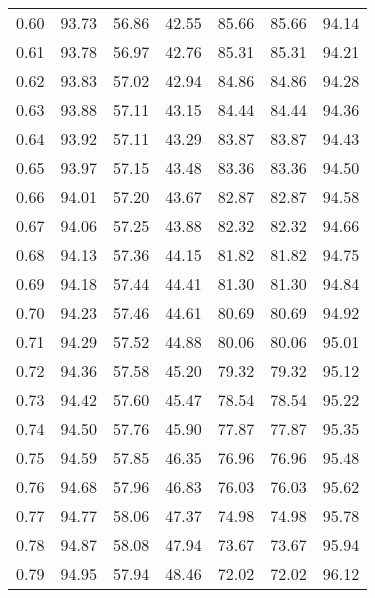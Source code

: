 \begin{tabular}{|c|c|c|c|c|c|c|}
      0.60 &     93.73 &     56.86 &      42.55 &   85.66 &      85.66 &         94.14 \\
      0.61 &     93.78 &     56.97 &      42.76 &   85.31 &      85.31 &         94.21 \\
      0.62 &     93.83 &     57.02 &      42.94 &   84.86 &      84.86 &         94.28 \\
      0.63 &     93.88 &     57.11 &      43.15 &   84.44 &      84.44 &         94.36 \\
      0.64 &     93.92 &     57.11 &      43.29 &   83.87 &      83.87 &         94.43 \\
      0.65 &     93.97 &     57.15 &      43.48 &   83.36 &      83.36 &         94.50 \\
      0.66 &     94.01 &     57.20 &      43.67 &   82.87 &      82.87 &         94.58 \\
      0.67 &     94.06 &     57.25 &      43.88 &   82.32 &      82.32 &         94.66 \\
      0.68 &     94.13 &     57.36 &      44.15 &   81.82 &      81.82 &         94.75 \\
      0.69 &     94.18 &     57.44 &      44.41 &   81.30 &      81.30 &         94.84 \\
      0.70 &     94.23 &     57.46 &      44.61 &   80.69 &      80.69 &         94.92 \\
      0.71 &     94.29 &     57.52 &      44.88 &   80.06 &      80.06 &         95.01 \\
      0.72 &     94.36 &     57.58 &      45.20 &   79.32 &      79.32 &         95.12 \\
      0.73 &     94.42 &     57.60 &      45.47 &   78.54 &      78.54 &         95.22 \\
      0.74 &     94.50 &     57.76 &      45.90 &   77.87 &      77.87 &         95.35 \\
      0.75 &     94.59 &     57.85 &      46.35 &   76.96 &      76.96 &         95.48 \\
      0.76 &     94.68 &     57.96 &      46.83 &   76.03 &      76.03 &         95.62 \\
      0.77 &     94.77 &     58.06 &      47.37 &   74.98 &      74.98 &         95.78 \\
      0.78 &     94.87 &     58.08 &      47.94 &   73.67 &      73.67 &         95.94 \\
      0.79 &     94.95 &     57.94 &      48.46 &   72.02 &      72.02 &         96.12 \\

\end{tabular}
